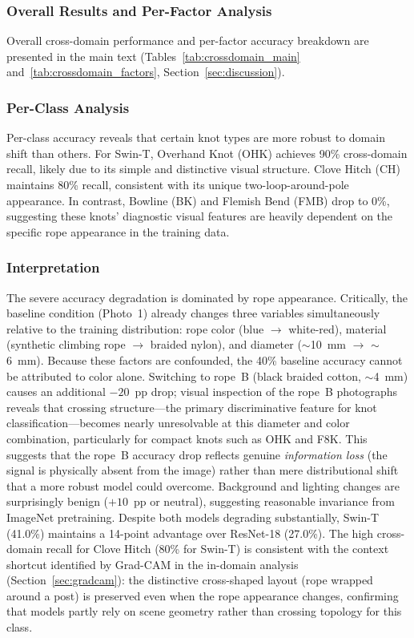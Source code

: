 \documentclass[preprint,review,12pt]{elsarticle}
\begin{document}
\subsubsection*{Overall Results and Per-Factor Analysis}

Overall cross-domain performance and per-factor accuracy breakdown are presented in the main text (Tables~\ref{tab:crossdomain_main} and~\ref{tab:crossdomain_factors}, Section~\ref{sec:discussion}).

\subsubsection*{Per-Class Analysis}

Per-class accuracy reveals that certain knot types are more robust to domain shift than others. For Swin-T, Overhand Knot (OHK) achieves 90\% cross-domain recall, likely due to its simple and distinctive visual structure. Clove Hitch (CH) maintains 80\% recall, consistent with its unique two-loop-around-pole appearance. In contrast, Bowline (BK) and Flemish Bend (FMB) drop to 0\%, suggesting these knots' diagnostic visual features are heavily dependent on the specific rope appearance in the training data.

\subsubsection*{Interpretation}

The severe accuracy degradation is dominated by rope appearance. Critically, the baseline condition (Photo~1) already changes three variables simultaneously relative to the training distribution: rope color (blue $\to$ white-red), material (synthetic climbing rope $\to$ braided nylon), and diameter ($\sim$10~mm $\to$ $\sim$6~mm). Because these factors are confounded, the 40\% baseline accuracy cannot be attributed to color alone. Switching to rope~B (black braided cotton, $\sim$4~mm) causes an additional $-20$~pp drop; visual inspection of the rope~B photographs reveals that crossing structure---the primary discriminative feature for knot classification---becomes nearly unresolvable at this diameter and color combination, particularly for compact knots such as OHK and F8K. This suggests that the rope~B accuracy drop reflects genuine \emph{information loss} (the signal is physically absent from the image) rather than mere distributional shift that a more robust model could overcome. Background and lighting changes are surprisingly benign ($+10$~pp or neutral), suggesting reasonable invariance from ImageNet pretraining. Despite both models degrading substantially, Swin-T (41.0\%) maintains a 14-point advantage over ResNet-18 (27.0\%). The high cross-domain recall for Clove Hitch (80\% for Swin-T) is consistent with the context shortcut identified by Grad-CAM in the in-domain analysis (Section~\ref{sec:gradcam}): the distinctive cross-shaped layout (rope wrapped around a post) is preserved even when the rope appearance changes, confirming that models partly rely on scene geometry rather than crossing topology for this class.
\end{document}
